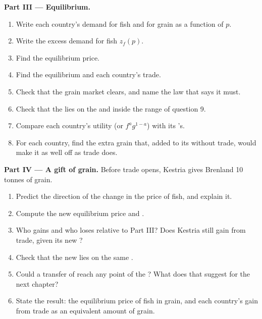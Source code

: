 \begin{problem}
\medskip
\noindent\textbf{Part III --- Equilibrium.}
\begin{enumerate}[resume]
  \item Write each country's demand for fish and for grain as a function of $p$.
  \item Write the excess demand for fish $z_f(p)$.
  \item Find the equilibrium price.
  \item Find the equilibrium  and each country's trade.
  \item Check that the grain market clears, and name the law that says it must.
  \item Check that the  lies on the  and inside the range of question 9.
  \item Compare each country's utility (or $f^{a}g^{1-a}$) with its 's.
  \item For each country, find the extra grain that, added to its  without trade, would make it
        as well off as trade does.
\end{enumerate}

\medskip
\noindent\textbf{Part IV --- A gift of grain.} Before trade opens, Kestria gives Brenland 10 tonnes of
grain.
\begin{enumerate}[resume]
  \item Predict the direction of the change in the price of fish, and explain it.
  \item Compute the new equilibrium price and .
  \item Who gains and who loses relative to Part III? Does Kestria still gain from trade, given its new
        ?
  \item Check that the new  lies on the same .
  \item Could a transfer of  reach any point of the ? What does that suggest
        for the next chapter?
  \item State the result: the equilibrium price of fish in grain, and each country's gain from trade as
        an equivalent amount of grain.
\end{enumerate}
\end{problem}
